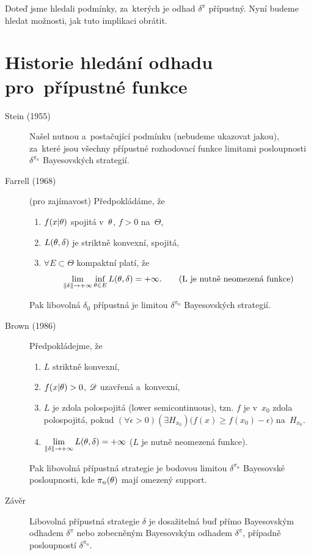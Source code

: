 \begin{remark}
	Doteď jsme hledali podmínky, za~kterých je odhad  $\delta^{\pi}$ přípustný. Nyní budeme hledat možnosti, jak tuto implikaci obrátit.
	\section{Historie hledání odhadu pro~přípustné funkce}
	\begin{description}
		\item[Stein (1955)] Našel nutnou a~postačující podmínku (nebudeme ukazovat jakou), za~které jsou všechny přípustné rozhodovací funkce limitami posloupnosti $\delta^{\pi_n}$ Bayesovských strategií.
		\item[Farrell (1968)] (pro zajímavost) Předpokládáme, že \begin{enumerate}[1)]
			\item $f(x|\theta)$ spojitá v~$\theta$, $f>0$ na~$\Theta$,
			\item $L(\theta,\delta)$ je striktně konvexní, spojitá,
			\item $\forall E\subset\Theta$ kompaktní platí, že 
			$$ \lim\limits_{\left\|\delta\right\|\to+\infty}\inf\limits_{\theta\in E}L(\theta,\delta)=+\infty.\qquad(\text{L je nutně neomezená funkce})$$ 
		\end{enumerate}
		Pak libovolná $\delta_0$ přípustná je limitou $\delta^{\pi_n}$ Bayesovských strategií.
		\item[Brown (1986)] Předpokládejme, že \begin{enumerate}[1)]
			\item $L$ striktně konvexní,
			\item $f(x|\theta)>0$, $\mathscr{D} $ uzavřená a~konvexní,
			\item $L$ je zdola polospojitá (lower semicontinuous), tzn. $f$ je v~$x_0$ zdola polospojitá, pokud $(\forall\epsilon>0)(\exists H_{x_0})\big(f(x)\geq f(x_0)-\epsilon\big)$ na~$H_{x_0}$.
			\item $\lim\limits_{\left\|\delta\right\|\to+\infty} L(\theta,\delta)=+\infty$ \hspace{0.2cm} ($L$ je nutně neomezená funkce).
		\end{enumerate}
		Pak libovolná přípustná strategie je bodovou limitou $\delta^{\pi_n}$ Bayesovské posloupnosti, kde $\pi_n(\theta)$ mají omezený support.
		\item[Závěr] Libovolná přípustná strategie $\delta$ je dosažitelná buď přímo Bayesovským odhadem $\delta^\pi$ nebo zobecněným Bayesovským odhadem $\delta^\pi$, případně posloupností $\delta^{\pi_n}$.
	\end{description}
\end{remark}
